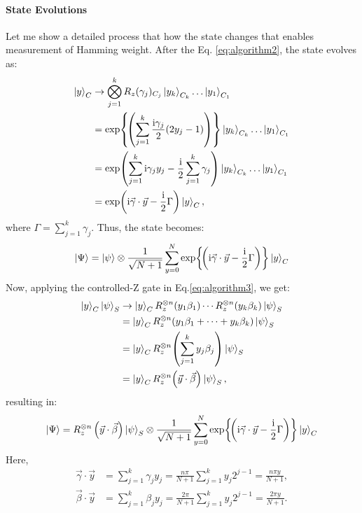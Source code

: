 \documentclass[a4paper, 11pt]{article}
\begin{document}
\paragraph{State Evolutions}
Let me show a detailed process that how the state changes that enables measurement of Hamming weight.
After the Eq. \ref{eq:algorithm2}, the state evolves as:
\begin{align}
    \ket{y}_C &\rightarrow \bigotimes_{j=1}^k R_z(\gamma_j)_{C_j} \ket{y_k}_{C_k} \ldots \ket{y_1}_{C_1} \notag \\
    &= \exp{\!\left( \sum_{j=1}^k \frac{\mathrm{i} \gamma_j}{2}(2y_j - 1) \right)} \ket{y_k}_{C_k} \ldots \ket{y_1}_{C_1} \notag \\
    &= \exp\!\left( \sum_{j=1}^k \mathrm{i} \gamma_j y_j - \frac{\mathrm{i}}{2} \sum_{j=1}^k\gamma_j \right)\ket{y_k}_{C_k} \ldots \ket{y_1}_{C_1} \notag \\
    &= \exp\!\left( \mathrm{i} \vec{\gamma}\cdot\vec{y}  - \frac{\mathrm{i}}{2} \Gamma \right) \ket{y}_C,
\end{align}
where $\Gamma = \sum_{j=1}^k \gamma_j$.
Thus, the state becomes:
\begin{align}
	\ket{\Psi} = \ket{\psi} \otimes \frac{1}{\sqrt{N+1}} \sum_{y=0}^N \exp{\!\left( \mathrm{i} \vec{\gamma}\cdot\vec{y}  - \frac{\mathrm{i}}{2} \Gamma \right)} \ket{y}_C
\end{align} 
Now, applying the controlled-Z gate in Eq.\ref{eq:algorithm3}, we get:
\begin{align}
	\ket{y}_C \ket{\psi}_S 
    &\rightarrow \ket{y}_C R_z^{\otimes n}(y_1 \beta_1) \cdots R_z^{\otimes n}(y_k \beta_k) \ket{\psi}_S \notag \\
    &= \ket{y}_C R_z^{\otimes n} (y_1\beta_1 + \cdots + y_k \beta_k) \ket{\psi}_S \notag \\
    &= \ket{y}_C R_z^{\otimes n} \!\left(\sum_{j=1}^k y_j\beta_j \right) \ket{\psi}_S \notag \\
    &= \ket{y}_C R_z^{\otimes n} \!\left(\vec{y}\cdot\vec{\beta} \right) \ket{\psi}_S,
\end{align}
resulting in:
\begin{align}
	\ket{\Psi} = R_z^{\otimes n} \left(\vec{y}\cdot \vec{\beta}\right) \ket{\psi}_S \otimes \frac{1}{\sqrt{N+1}} \sum_{y=0}^N \exp{\!\left( \mathrm{i} \vec{\gamma}\cdot\vec{y}  - \frac{\mathrm{i}}{2} \Gamma \right)} \ket{y}_C
\end{align}
Here, 
\begin{align}
    \vec{\gamma}\cdot\vec{y} &= \sum_{j=1}^k \gamma_j y_j =\frac{n \pi}{N+1} \sum_{j=1}^k y_j 2^{j-1} = \frac{n \pi y}{N+1}, \\
    \vec{\beta}\cdot\vec{y} &= \sum_{j=1}^k \beta_j y_j =\frac{2 \pi}{N+1} \sum_{j=1}^k y_j 2^{j-1} = \frac{2 \pi y}{N+1}.
\end{align}
\end{document}
